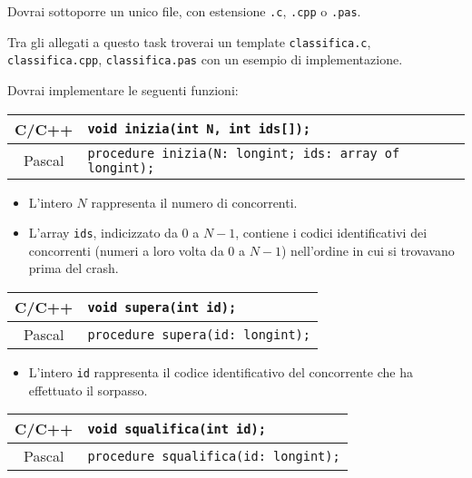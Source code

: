 \Implementation

Dovrai sottoporre un unico file, con estensione \texttt{.c}, \texttt{.cpp} o \texttt{.pas}.

\begin{warning}
Tra gli allegati a questo task troverai un template \texttt{classifica.c}, \texttt{classifica.cpp}, \texttt{classifica.pas} con un esempio di implementazione.
\end{warning}

Dovrai implementare le seguenti funzioni:

\begin{center}\begin{tabularx}{\textwidth}{|c|X|}
\hline
C/C++  & \verb|void inizia(int N, int ids[]);|\\
\hline
Pascal  & \verb|procedure inizia(N: longint; ids: array of longint);|\\
\hline
\end{tabularx}\end{center}

\begin{itemize}[nolistsep]
  \item L'intero $N$ rappresenta il numero di concorrenti.
  \item L'array \texttt{ids}, indicizzato da $0$ a $N-1$, contiene i codici identificativi dei concorrenti (numeri a loro volta da $0$ a $N-1$) nell'ordine in cui si trovavano prima del crash.
\end{itemize}

\medskip

\begin{center}\begin{tabularx}{\textwidth}{|c|X|}
\hline
C/C++  & \verb|void supera(int id);|\\
\hline
Pascal  & \verb|procedure supera(id: longint);|\\
\hline
\end{tabularx}\end{center}

\begin{itemize}[nolistsep]
  \item L'intero \texttt{id} rappresenta il codice identificativo del concorrente che ha effettuato il sorpasso.
\end{itemize}

\medskip

\begin{center}\begin{tabularx}{\textwidth}{|c|X|}
\hline
C/C++  & \verb|void squalifica(int id);|\\
\hline
Pascal  & \verb|procedure squalifica(id: longint);|\\
\hline
\end{tabularx}\end{center}

